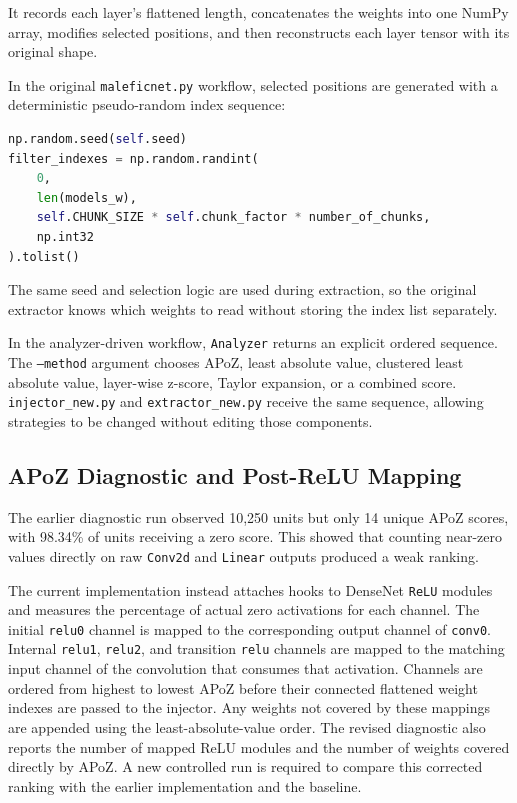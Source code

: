 \documentclass[11pt,a4paper]{article}
\newcommand{\code}[1]{\texttt{#1}}
\begin{document}
It records each layer's flattened length, concatenates the weights into one NumPy array, modifies selected positions, and then reconstructs each layer tensor with its original shape.

In the original \code{maleficnet.py} workflow, selected positions are generated with a deterministic pseudo-random index sequence:

\begin{lstlisting}[language=Python]
np.random.seed(self.seed)
filter_indexes = np.random.randint(
    0,
    len(models_w),
    self.CHUNK_SIZE * self.chunk_factor * number_of_chunks,
    np.int32
).tolist()
\end{lstlisting}

The same seed and selection logic are used during extraction, so the original extractor knows which weights to read without storing the index list separately.

In the analyzer-driven workflow, \code{Analyzer} returns an explicit ordered sequence. The \code{--method} argument chooses APoZ, least absolute value, clustered least absolute value, layer-wise z-score, Taylor expansion, or a combined score. \code{injector\_new.py} and \code{extractor\_new.py} receive the same sequence, allowing strategies to be changed without editing those components.

\subsection{APoZ Diagnostic and Post-ReLU Mapping}

The earlier diagnostic run observed 10,250 units but only 14 unique APoZ scores, with 98.34\% of units receiving a zero score. This showed that counting near-zero values directly on raw \code{Conv2d} and \code{Linear} outputs produced a weak ranking.

The current implementation instead attaches hooks to DenseNet \code{ReLU} modules and measures the percentage of actual zero activations for each channel. The initial \code{relu0} channel is mapped to the corresponding output channel of \code{conv0}. Internal \code{relu1}, \code{relu2}, and transition \code{relu} channels are mapped to the matching input channel of the convolution that consumes that activation. Channels are ordered from highest to lowest APoZ before their connected flattened weight indexes are passed to the injector. Any weights not covered by these mappings are appended using the least-absolute-value order. The revised diagnostic also reports the number of mapped ReLU modules and the number of weights covered directly by APoZ. A new controlled run is required to compare this corrected ranking with the earlier implementation and the baseline.
\end{document}
